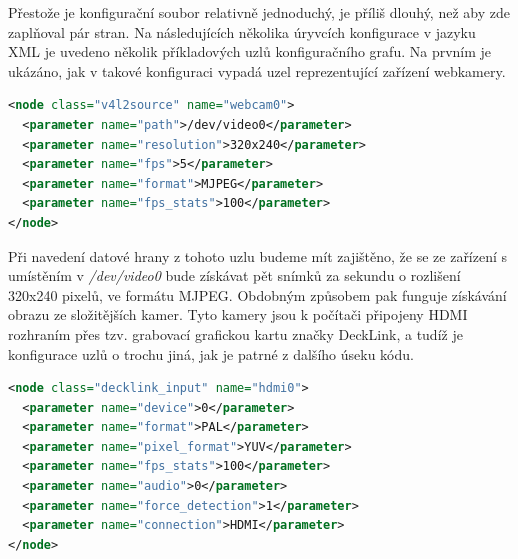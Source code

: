\documentclass[thesis=M,czech]{FITthesis}[2012/06/26]
\begin{document}
Přestože je konfigurační soubor relativně jednoduchý, je příliš dlouhý, než aby zde zaplňoval pár stran. Na následujících několika úryvcích konfigurace v jazyku XML je uvedeno několik příkladových uzlů konfiguračního grafu. Na prvním je ukázáno, jak v takové konfiguraci vypadá uzel reprezentující zařízení webkamery.\\

\begin{lstlisting}[language=XML]
<node class="v4l2source" name="webcam0">
  <parameter name="path">/dev/video0</parameter>
  <parameter name="resolution">320x240</parameter>
  <parameter name="fps">5</parameter>
  <parameter name="format">MJPEG</parameter>
  <parameter name="fps_stats">100</parameter>
</node>
\end{lstlisting}

Při navedení datové hrany z tohoto uzlu budeme mít zajištěno, že se ze zařízení s umístěním v \textit{/dev/video0} bude získávat pět snímků za sekundu o rozlišení 320x240 pixelů, ve formátu MJPEG. Obdobným způsobem pak funguje získávání obrazu ze složitějších kamer. Tyto kamery jsou k počítači připojeny HDMI rozhraním přes tzv. grabovací grafickou kartu značky DeckLink, a tudíž je konfigurace uzlů o trochu jiná, jak je patrné z dalšího úseku kódu.\\

\begin{lstlisting}[language=XML]
<node class="decklink_input" name="hdmi0">
  <parameter name="device">0</parameter>
  <parameter name="format">PAL</parameter>
  <parameter name="pixel_format">YUV</parameter>
  <parameter name="fps_stats">100</parameter>
  <parameter name="audio">0</parameter>
  <parameter name="force_detection">1</parameter>
  <parameter name="connection">HDMI</parameter>
</node>
\end{lstlisting}
\end{document}
